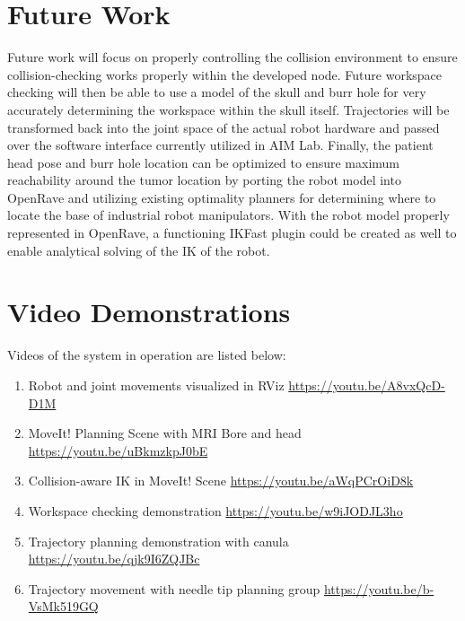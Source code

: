\documentclass[12pt]{report}
\begin{document}
\chapter{Future Work}
Future work will focus on properly controlling the collision environment to ensure collision-checking works properly within the developed node. Future workspace checking will then be able to use a model of the skull and burr hole for very accurately determining the workspace within the skull itself. Trajectories will be transformed back into the joint space of the actual robot hardware and passed over the software interface currently utilized in AIM Lab. Finally, the patient head pose and burr hole location can be optimized to ensure maximum reachability around the tumor location by porting the robot model into OpenRave and utilizing existing optimality planners for determining where to locate the base of industrial robot manipulators. \cite{workspaceChecker} With the robot model properly represented in OpenRave, a functioning IKFast plugin could be created as well to enable analytical solving of the IK of the robot.


\appendix
\chapter{Video Demonstrations}
\label{sec:appendixVideos}
Videos of the system in operation are listed below:
\begin{enumerate}
\item Robot and joint movements visualized in RViz \url{https://youtu.be/A8vxQcD-D1M}
\item MoveIt! Planning Scene with MRI Bore and head \url{https://youtu.be/uBkmzkpJ0bE}
\item Collision-aware IK in MoveIt! Scene \url{https://youtu.be/aWqPCrOiD8k}
\item Workspace checking demonstration \url{https://youtu.be/w9iJODJL3ho}
\item Trajectory planning demonstration with canula \url{https://youtu.be/qjk9I6ZQJBc}
\item Trajectory movement with needle tip planning group \url{https://youtu.be/b-VsMk519GQ}
\end{enumerate}

\singlespacing
\end{document}
